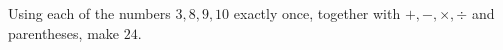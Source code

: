 Using each of the numbers $3,8,9,10$ exactly once, together with $+,-,\times,\div$ and parentheses, make $24$.
